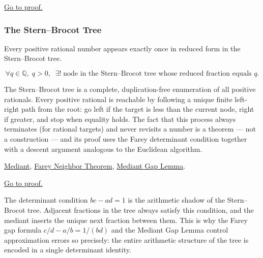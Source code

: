 \begin{remark*}[Proof]
\hyperref[prf:mediant-gap]{Go to proof.}
\end{remark*}

\subsubsection{The Stern--Brocot Tree}

\begin{theorem}
\label{thm:stern-brocot-enumeration}
Every positive rational number appears exactly once in reduced form in
the Stern--Brocot tree.
\end{theorem}

\begin{remark*}
\[
\forall q \in \mathbb{Q},\; q > 0,\;\;
\exists!\; \text{node in the Stern--Brocot tree whose reduced fraction equals } q.
\]
\end{remark*}

\begin{remark*}[Interpretation]
The Stern--Brocot tree is a complete, duplication-free enumeration of all
positive rationals.  Every positive rational is reachable by following a
unique finite left-right path from the root: go left if the target is less
than the current node, right if greater, and stop when equality holds.
The fact that this process always terminates (for rational targets) and
never revisits a number is a theorem — not a construction — and its proof
uses the Farey determinant condition together with a descent argument
analogous to the Euclidean algorithm.
\end{remark*}

\begin{remark*}[Dependencies]
\hyperref[def:mediant]{Mediant},
\hyperref[thm:farey-neighbor-theorem]{Farey Neighbor Theorem},
\hyperref[lem:mediant-gap]{Mediant Gap Lemma}.
\end{remark*}

\begin{remark*}[Proof]
\hyperref[prf:stern-brocot-enumeration]{Go to proof.}
\end{remark*}

\begin{remark}
The determinant condition $bc - ad = 1$ is the arithmetic shadow of the
Stern--Brocot tree.  Adjacent fractions in the tree always satisfy this
condition, and the mediant inserts the unique next fraction between them.
This is why the Farey gap formula $c/d - a/b = 1/(bd)$ and the Mediant
Gap Lemma control approximation errors so precisely: the entire arithmetic
structure of the tree is encoded in a single determinant identity.
\end{remark}
